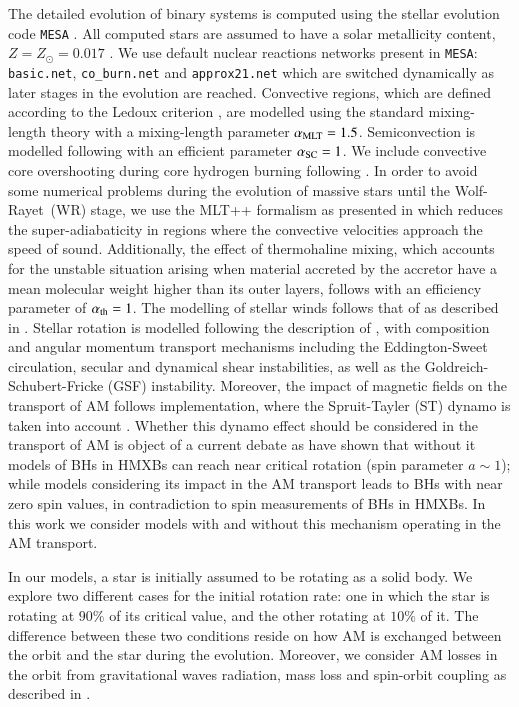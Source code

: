 \documentclass{aa}
\begin{document}
The detailed evolution of binary systems is computed using the stellar evolution code {\tt MESA}
\citep[version 15140,][]{paxton2011, paxton2013, paxton2015, paxton2018, paxton2019}. All computed stars are assumed to have a solar
metallicity content, $Z = Z_\odot = 0.017$ \citep{grevesse1998}. We use default nuclear reactions networks present in {\tt MESA}:
{\tt basic.net}, {\tt co\_burn.net} and {\tt approx21.net} which are switched dynamically as later stages in the evolution are reached.
Convective regions, which are defined according to the Ledoux criterion \citep{ledoux1947}, are modelled using the standard mixing-length
theory \citep{bohmvitense1958} with a mixing-length parameter $\alpha_{\rm MLT} = 1.5$. Semiconvection is modelled following
\citet{langer1983} with an efficient parameter $\alpha_{\rm SC} = 1$. We include convective core overshooting during core hydrogen burning
following \citet{brott2011}. In order to avoid some numerical problems during the evolution of massive stars until the Wolf-Rayet~(WR)
stage, we use the MLT++ formalism as presented in \citet{paxton2013} which reduces the super-adiabaticity in regions where the convective
velocities approach the speed of sound. Additionally, the effect of thermohaline mixing, which accounts for the unstable situation arising
when material accreted by the accretor have a mean molecular weight higher than its outer layers, follows \citet{kippenhahn1980} with an
efficiency parameter of $\alpha_{\rm th} = 1$. The modelling of stellar winds follows that of \citet{brott2011} as described in
\citet{marchant2017}. Stellar rotation is modelled following the description of \citet{heger2000}, with composition and angular momentum
transport mechanisms including the Eddington-Sweet circulation, secular and dynamical shear instabilities, as well as the
Goldreich-Schubert-Fricke (GSF) instability. Moreover, the impact of magnetic fields on the transport of AM follows \citet{petrovic2005}
implementation, where the Spruit-Tayler (ST) dynamo is taken into account \citep{spruit2002}. Whether this dynamo effect should be
considered in the transport of AM is object of a current debate as \citet{qin2019} have shown that without it models of BHs in HMXBs can
reach near critical rotation (spin parameter $a \sim 1$); while models considering its impact in the AM transport leads to BHs with near
zero spin values, in contradiction to spin measurements of BHs in HMXBs. In this work we consider models with and without this mechanism
operating in the AM transport.

In our models, a star is initially assumed to be rotating as a solid body. We explore two different cases for the initial rotation rate:
one in which the star is rotating at $90\%$ of its critical value, and the other rotating at $10\%$ of it. The difference between these two
conditions reside on how AM is exchanged between the orbit and the star during the evolution. Moreover, we consider AM losses in the orbit
from gravitational waves radiation, mass loss and spin-orbit coupling as described in \citet{paxton2015}.
\end{document}
